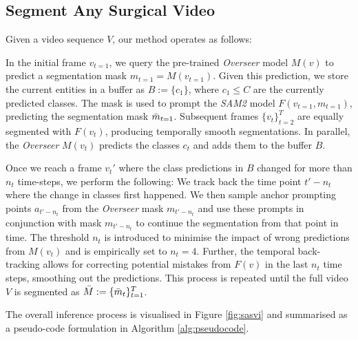 \subsection{Segment Any Surgical Video}
Given a video sequence $V$, our method operates as follows:

In the initial frame $v_{t=1}$, we query the pre-trained \emph{Overseer} model $M(v)$ to predict a segmentation mask $m_{t=1} = M(v_{t=1})$.
Given this prediction, we store the current entities in a buffer as $B := \{c_1\}$, where $c_1 \leq C$ are the currently predicted classes.
The mask is used to prompt the \emph{SAM2} model $F(v_{t=1},m_{t=1})$, predicting the segmentation mask $\Bar{m}_{t=1}$. 
Subsequent frames $\{v_t\}_{t=2}^{T}$ are equally segmented with $F(v_t)$, producing temporally smooth segmentations.
In parallel, the \emph{Overseer} $M(v_t)$ predicts the classes $c_t$ and adds them to the buffer $B$. 

Once we reach a frame $v_t'$ where the class predictions in $B$ changed for more than $n_t$ time-steps, we perform the following: We track back the time point $t'-n_t$ where the change in classes first happened. We then sample anchor prompting points $a_{t'-n_t}$ from the \emph{Overseer} mask $m_{t'-n_t}$ and use these prompts in conjunction with mask $m_{t'-n_t}$ to continue the segmentation from that point in time. The threshold $n_t$ is introduced to minimise the impact of wrong predictions from $M(v_t)$ and is empirically set to $n_t = 4$. Further, the temporal back-tracking allows for correcting potential mistakes from $F(v)$ in the last $n_t$ time steps, smoothing out the predictions. This process is repeated until the full video $V$ is segmented as $\Bar{M} := \{\Bar{m}_t\}_{t=1}^T$.

The overall inference process is visualised in Figure \ref{fig:sasvi} and summarised as a pseudo-code formulation in Algorithm \ref{alg:pseudocode}.

